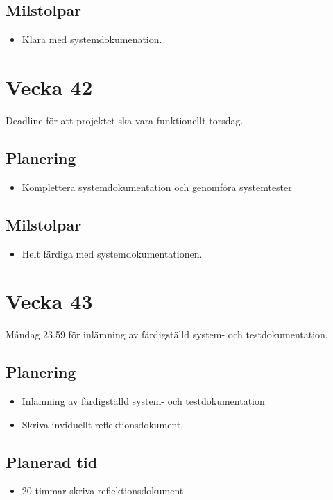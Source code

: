 \documentclass{TDP003mall}
\begin{document}
\subsection{Milstolpar}
\begin{itemize}
\item Klara med systemdokumenation.
\end{itemize}

\section{Vecka 42}
Deadline för att projektet ska vara funktionellt torsdag.\\

\subsection{Planering}
\begin{itemize}
\item Komplettera systemdokumentation och genomföra systemtester
\end{itemize}

\subsection{Milstolpar}
\begin{itemize}
\item Helt färdiga med systemdokumentationen.
\end{itemize}

\section{Vecka 43}
Måndag 23.59 för inlämning av färdigställd system- och testdokumentation.\\
\subsection{Planering}
\begin{itemize}
\item Inlämning av färdigställd system- och testdokumentation
\item Skriva inviduellt reflektionsdokument.
\end{itemize}

\subsection{Planerad tid}
\begin{itemize}
\item 20 timmar skriva reflektionsdokument 
\end{itemize}
\end{document}
